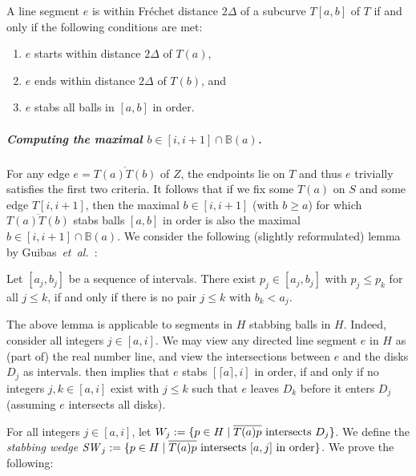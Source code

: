 \documentclass[a4paper,UKenglish,cleveref,thm-restate,notab]{lipics-v2021}
\makeatletter
\newcommand{\etal}{\textit{et~al.\@}\xspace}
\newcommand{\f}{Fr\'echet\xspace}
\newcommand{\B}{\mathbb{B}}
\newcommand{\ceil}[1]{\lceil#1\rceil}
\newcommand{\SW}{\mathit{SW}}
\makeatother
\begin{document}
    \begin{lemma}
        \label{lem:categorization}
        A line segment $e$ is within \f distance $2\Delta$ of a subcurve $T[a, b]$ of $T$ if and only if the following conditions are met:
        \begin{enumerate}
            \item $e$ starts within distance $2\Delta$ of $T(a)$,
            \item $e$ ends within distance $2\Delta$ of $T(b)$, and
            \item $e$ stabs all balls in $[a, b]$ in order. 
        \end{enumerate}
    \end{lemma}        
        
\subparagraph*{Computing the maximal $b \in [i, i+1] \cap \B(a)$.}
    For any edge $e = \overline{T(a)T(b)}$ of $Z$, the endpoints lie on $T$ and thus $e$ trivially satisfies the first two criteria. 
    It follows that if we fix some $T(a)$ on $S$ and some edge $T[i, i+1]$, then the maximal $b \in [i, i+1]$ (with $b \geq a$) for which $\overline{T(a) T(b)}$ stabs balls $[a, b]$ in order is also the maximal $b \in [i, i+1] \cap \B(a)$. 
    We consider the following (slightly reformulated) lemma by Guibas~\etal~\cite{guibas93minimum_link}:
    
    \begin{lemma}
        \label{lem:ordered_intervals}
        Let $[a_j, b_j]$ be a sequence of intervals. 
        There exist $p_j \in [a_j, b_j]$ with $p_j \leq p_k$ for all $j \leq k$, if and only if there is no pair $j \leq k$ with $b_k < a_j$.
    \end{lemma}
    
    The above lemma is applicable to segments in $H$ stabbing balls in $H$. 
    Indeed, consider all integers $j \in [a, i]$. 
    We may view any directed line segment $e$ in $H$ as (part of) the real number line, and view the intersections between $e$ and the disks $D_j$ as intervals.
     then implies that $e$ stabs $[\ceil{a}, i]$ in order, if and only if no integers $j, k \in [a, i]$ exist with $j \leq k$ such that $e$ leaves $D_k$ before it enters $D_j$ (assuming $e$ intersects all disks).
    
    For all integers $j \in [a, i]$, let $W_j := \{ p \in H \mid \overline{T(a) p} \textnormal{ intersects } D_j \}$. 
    We define the \emph{stabbing wedge} $\SW_j := \{ p \in H \mid \overline{T(a) p} \textnormal{ intersects } [a, j]  \textnormal{ in order} \}$. 
    We prove the following:
    
\end{document}
